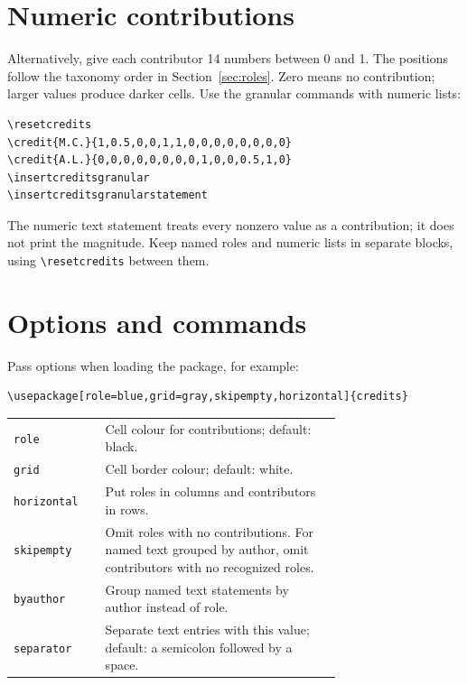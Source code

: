 \documentclass[a4paper,11pt]{article}
\begin{document}
\resetcredits
{}
\begin{center}
\insertcredits
\end{center}

\section{Numeric contributions}

Alternatively, give each contributor 14 numbers between 0 and 1.
The positions follow the taxonomy order in Section~\ref{sec:roles}.
Zero means no contribution; larger values produce darker cells.
Use the granular commands with numeric lists:

\begin{verbatim}
\resetcredits
\credit{M.C.}{1,0.5,0,0,1,1,0,0,0,0,0,0,0,0}
\credit{A.L.}{0,0,0,0,0,0,0,0,1,0,0,0.5,1,0}
\insertcreditsgranular
\insertcreditsgranularstatement
\end{verbatim}

\resetcredits
{}
\begin{center}
\insertcreditsgranular
\end{center}
\noindent\insertcreditsgranularstatement

\medskip
The numeric text statement treats every nonzero value as a contribution;
it does not print the magnitude. Keep named roles and numeric lists in
separate blocks, using \verb|\resetcredits| between them.

\section{Options and commands}

Pass options when loading the package, for example:
\begin{verbatim}
\usepackage[role=blue,grid=gray,skipempty,horizontal]{credits}
\end{verbatim}

\noindent\begin{tabular}{@{}lp{0.72\linewidth}@{}}
\texttt{role} & Cell colour for contributions; default: black.\\
\texttt{grid} & Cell border colour; default: white.\\
\texttt{horizontal} & Put roles in columns and contributors in rows.\\
\texttt{skipempty} & Omit roles with no contributions. For named text grouped
  by author, omit contributors with no recognized roles.\\
\texttt{byauthor} & Group named text statements by author instead of role.\\
\texttt{separator} & Separate text entries with this value; default: a
  semicolon followed by a space.\\
\end{tabular}
\end{document}
